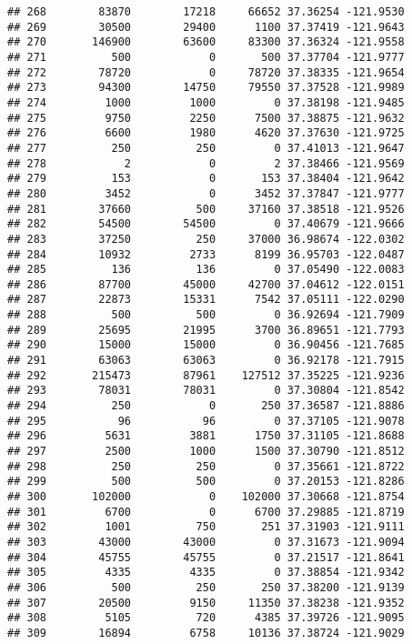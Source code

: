 \documentclass[
]{book}
\begin{document}
\begin{verbatim}
## 268        83870        17218     66652 37.36254 -121.9530
## 269        30500        29400      1100 37.37419 -121.9643
## 270       146900        63600     83300 37.36324 -121.9558
## 271          500            0       500 37.37704 -121.9777
## 272        78720            0     78720 37.38335 -121.9654
## 273        94300        14750     79550 37.37528 -121.9989
## 274         1000         1000         0 37.38198 -121.9485
## 275         9750         2250      7500 37.38875 -121.9632
## 276         6600         1980      4620 37.37630 -121.9725
## 277          250          250         0 37.41013 -121.9647
## 278            2            0         2 37.38466 -121.9569
## 279          153            0       153 37.38404 -121.9642
## 280         3452            0      3452 37.37847 -121.9777
## 281        37660          500     37160 37.38518 -121.9526
## 282        54500        54500         0 37.40679 -121.9666
## 283        37250          250     37000 36.98674 -122.0302
## 284        10932         2733      8199 36.95703 -122.0487
## 285          136          136         0 37.05490 -122.0083
## 286        87700        45000     42700 37.04612 -122.0151
## 287        22873        15331      7542 37.05111 -122.0290
## 288          500          500         0 36.92694 -121.7909
## 289        25695        21995      3700 36.89651 -121.7793
## 290        15000        15000         0 36.90456 -121.7685
## 291        63063        63063         0 36.92178 -121.7915
## 292       215473        87961    127512 37.35225 -121.9236
## 293        78031        78031         0 37.30804 -121.8542
## 294          250            0       250 37.36587 -121.8886
## 295           96           96         0 37.37105 -121.9078
## 296         5631         3881      1750 37.31105 -121.8688
## 297         2500         1000      1500 37.30790 -121.8512
## 298          250          250         0 37.35661 -121.8722
## 299          500          500         0 37.20153 -121.8286
## 300       102000            0    102000 37.30668 -121.8754
## 301         6700            0      6700 37.29885 -121.8719
## 302         1001          750       251 37.31903 -121.9111
## 303        43000        43000         0 37.31673 -121.9094
## 304        45755        45755         0 37.21517 -121.8641
## 305         4335         4335         0 37.38854 -121.9342
## 306          500          250       250 37.38200 -121.9139
## 307        20500         9150     11350 37.38238 -121.9352
## 308         5105          720      4385 37.39726 -121.9095
## 309        16894         6758     10136 37.38724 -121.9029

\end{verbatim}
\end{document}

